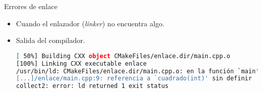 \begin{frame}[fragile]{Errores de enlace}
\begin{itemize}
  \item Cuando el enlazador (\emph{linker}) no encuentra algo.

  \item Salida del compilador.
\begin{lstlisting}[language=bash,basicstyle=\tiny\ttfamily]
[ 50%] Building CXX object CMakeFiles/enlace.dir/main.cpp.o
[100%] Linking CXX executable enlace
/usr/bin/ld: CMakeFiles/enlace.dir/main.cpp.o: en la función `main':
[...]/enlace/main.cpp:9: referencia a `cuadrado(int)' sin definir
collect2: error: ld returned 1 exit status
\end{lstlisting}
\end{itemize}
\end{frame}

